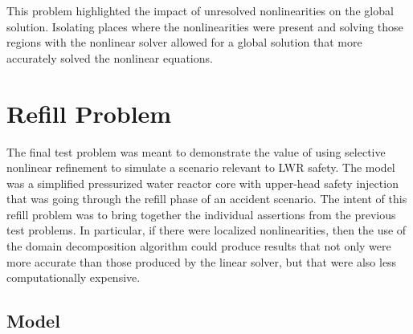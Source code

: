 This problem highlighted the impact of unresolved nonlinearities on the global solution.
Isolating places where the nonlinearities were present and solving those regions with the nonlinear solver allowed for a global solution that more accurately solved the nonlinear equations.

\section{Refill Problem}
\label{sect:refillProblem}

The final test problem was meant to demonstrate the value of using selective nonlinear refinement to simulate a scenario relevant to LWR safety.
The model was a simplified pressurized water reactor core with upper-head safety injection that was going through the refill phase of an accident scenario.
The intent of this refill problem was to bring together the individual assertions from the previous test problems.
In particular, if there were localized nonlinearities, then the use of the domain decomposition algorithm could produce results that not only were more accurate than those produced by the linear solver, but that were also less computationally expensive.

\subsection{Model}
\label{sect:refillModel}

